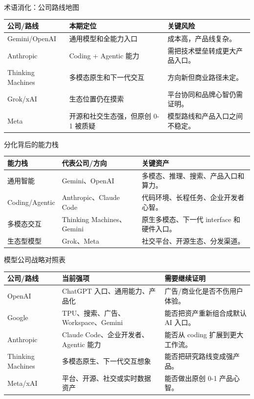 \documentclass[a4paper]{article}
\begin{document}
\begin{knowledgebox}{术语消化：公司路线地图}
\begin{tabularx}{\textwidth}{p{}p{}X}
\toprule
公司/路线 & 本期定位 & 关键风险 \\
\midrule
Gemini/OpenAI & 通用模型和全能力入口 & 成本高，产品线复杂。 \\
Anthropic & Coding + Agentic 能力 & 需把技术壁垒转成更大产品入口。 \\
Thinking Machines & 多模态原生和下一代交互 & 方向新但商业路径未定。 \\
Grok/xAI & 生态位置仍在摸索 & 平台协同和品牌心智仍需证明。 \\
Meta & 开源和社交生态强，但原创 0-1 被质疑 & 模型路线和产品入口之间不稳定。 \\
\bottomrule
\end{tabularx}
\end{knowledgebox}

\begin{knowledgebox}{分化背后的能力栈}
\begin{tabularx}{\textwidth}{p{}p{}X}
\toprule
能力栈 & 代表公司/方向 & 关键资产 \\
\midrule
通用智能 & Gemini、OpenAI & 多模态、推理、搜索、产品入口和算力。 \\
Coding/Agentic & Anthropic、Claude Code & 代码环境、长程任务、企业开发者心智。 \\
多模态交互 & Thinking Machines、Gemini & 原生多模态、下一代 interface 和硬件入口。 \\
生态型模型 & Grok、Meta & 社交平台、开源生态、分发渠道。 \\
\bottomrule
\end{tabularx}
\end{knowledgebox}

\begin{knowledgebox}{模型公司战略对照表}
\begin{tabularx}{\textwidth}{p{}p{}p{}}
\toprule
公司/路线 & 当前强项 & 需要继续证明 \\
\midrule
OpenAI & ChatGPT 入口、通用能力、产品化 & 广告/商业化是否不伤用户体验。 \\
Google & TPU、搜索、广告、Workspace、Gemini & 能否把资产重新组合成默认 AI 入口。 \\
Anthropic & Claude Code、企业开发者、Agentic 能力 & 能否从 coding 扩展到更大工作流。 \\
Thinking Machines & 多模态原生、下一代交互想象 & 能否把研究路线变成强产品。 \\
Meta/xAI & 平台、开源、社交或实时数据资产 & 能否做出原创 0-1 产品心智。 \\
\bottomrule
\end{tabularx}
\end{knowledgebox}
\end{document}
